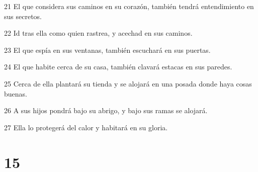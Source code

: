 \par 21 El que considera sus caminos en su corazón, también tendrá entendimiento en sus secretos.
\par 22 Id tras ella como quien rastrea, y acechad en sus caminos.
\par 23 El que espía en sus ventanas, también escuchará en sus puertas.
\par 24 El que habite cerca de su casa, también clavará estacas en sus paredes.
\par 25 Cerca de ella plantará su tienda y se alojará en una posada donde haya cosas buenas.
\par 26 A sus hijos pondrá bajo su abrigo, y bajo sus ramas se alojará.
\par 27 Ella lo protegerá del calor y habitará en su gloria.

\chapter{15}

